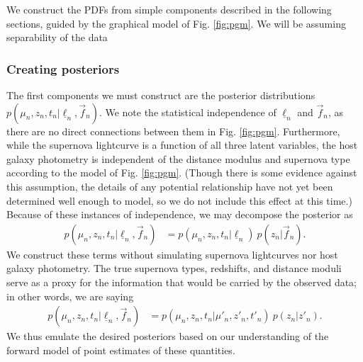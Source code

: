 \documentclass[12pt, onecolumn]{emulateapj}
\newcommand{\textul}{\underline}
\begin{document}
We construct the PDFs from simple components described in the following sections, guided by the graphical model of Fig. \ref{fig:pgm}.  We will be assuming separability of the data 

%
%
%
%

\subsubsection{Creating posteriors}
\label{sec:posteriors}

The first components we must construct are the posterior distributions $p(\mu_{n}, z_{n}, t_{n} | \textul{\ell}_{n}, \vec{f}_{n})$.  We note the statistical independence of $\textul{\ell}_{n}$ and $\vec{f}_{n}$, as there are no direct connections between them in Fig. \ref{fig:pgm}.  Furthermore, while the supernova lightcurve is a function of all three latent variables, the host galaxy photometry is independent of the distance modulus and supernova type according to the model of Fig. \ref{fig:pgm}.  (Though there is some evidence against this assumption, the details of any potential relationship have not yet been determined well enough to model, so we do not include this effect at this time.)  Because of these instances of independence, we may decompose the posterior as
\begin{align}
\label{eq:posteriors_decompose}
p(\mu_{n}, z_{n}, t_{n} | \textul{\ell}_{n}, \vec{f}_{n}) &= p(\mu_{n}, z_{n}, t_{n} | \textul{\ell}_{n})\ p(z_{n} | \vec{f}_{n}).
\end{align}
We construct these terms without simulating supernova lightcurves nor host galaxy photometry.  The true supernova types, redshifts, and distance moduli serve as a proxy for the information that would be carried by the observed data; in other words, we are saying
\begin{align}
\label{eq:posteriors_emulate}
p(\mu_{n}, z_{n}, t_{n} | \textul{\ell}_{n}, \vec{f}_{n}) &= p(\mu_{n}, z_{n}, t_{n} | \mu'_{n}, z'_{n}, t'_{n})\ p(z_{n} | z'_{n}).
\end{align}
We thus emulate the desired posteriors based on our understanding of the forward model of point estimates of these quantities.
\end{document}
